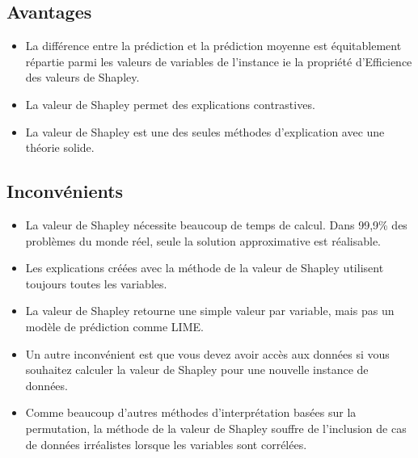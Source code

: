 \subsection{Avantages}
\begin{itemize}
  \item La différence entre la prédiction et la prédiction moyenne est équitablement répartie parmi les valeurs de variables de l'instance ie la propriété d'Efficience des valeurs de Shapley.
  \item La valeur de Shapley permet des explications contrastives.
  \item La valeur de Shapley est une des seules méthodes d'explication avec une théorie solide.
\end{itemize}

\subsection{Inconvénients}
\begin{itemize}
  \item La valeur de Shapley nécessite beaucoup de temps de calcul. Dans 99,9\% des problèmes du monde réel, seule la solution approximative est réalisable.
  \item Les explications créées avec la méthode de la valeur de Shapley utilisent toujours toutes les variables.
  \item La valeur de Shapley retourne une simple valeur par variable, mais pas un modèle de prédiction comme LIME.
  \item Un autre inconvénient est que vous devez avoir accès aux données si vous souhaitez calculer la valeur de Shapley pour une nouvelle instance de données.
  \item Comme beaucoup d'autres méthodes d'interprétation basées sur la permutation, la méthode de la valeur de Shapley souffre de l'inclusion de cas de données irréalistes lorsque les variables sont corrélées.
\end{itemize}
